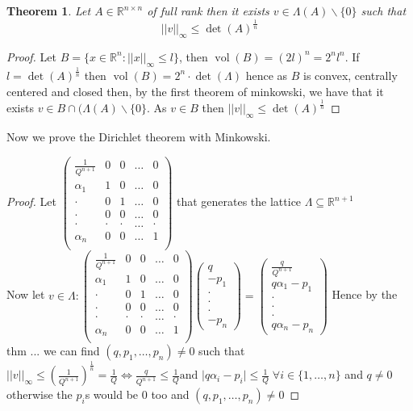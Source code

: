 \documentclass[a4paper,11pt,american]{article}
\newcommand{\R}{\mathbb{R}}
\DeclareMathOperator{\vol}{vol}
\theoremstyle{plain}
\newtheorem{theorem}{Theorem}
\theoremstyle{definition}
\begin{document}
\begin{theorem}
    Let $A\in \R^{n\times n}$ of full rank then it exists $v\in \Lambda(A)\backslash\{0\}$ such that $$\vert\vert v\vert\vert _{\infty}\leq \det(A)^\frac{1}{n}$$
\end{theorem}
\begin{proof}
    Let $B=\{x\in \R^n:\vert\vert x\vert\vert_{\infty}\leq l\}$, then $\vol(B)=(2l)^n=2^nl^n$. If $l= \det(A)^\frac{1}{n}$ then $\vol(B)=2^n\cdot\det(\Lambda)$ hence as $B$ is convex, centrally centered and closed then, by the first theorem of minkowski, we have that it exists $v\in B\cap (\Lambda(A)\backslash \{0\}$. As $v\in B$ then $\vert\vert v\vert\vert _{\infty}\leq \det(A)^\frac{1}{n}$ 
\end{proof}
Now we prove the Dirichlet theorem with Minkowski.
\begin{proof}
    
Let $\begin{pmatrix}
    \frac{1}{Q^{n+1}}& 0& 0 &\dots& 0\\
    \alpha_1& 1&0&\dots&0\\
    \cdot&0&1&\dots&0\\
    \cdot&0&0&\dots&0\\
    \cdot&\cdot&\cdot&\dots&\cdot\\
    \alpha_n&0&0&\dots&1\\
\end{pmatrix}$
 that generates the lattice $\Lambda\subseteq\R^{n+1}$\\
 Now let $v\in\Lambda:\begin{pmatrix}
    \frac{1}{Q^{n+1}}& 0& 0 &\dots& 0\\
    \alpha_1& 1&0&\dots&0\\
    \cdot&0&1&\dots&0\\
    \cdot&0&0&\dots&0\\
    \cdot&\cdot&\cdot&\dots&\cdot\\
    \alpha_n&0&0&\dots&1\\
\end{pmatrix}\begin{pmatrix}
    q\\
    -p_1\\
    \cdot\\
    \cdot\\
    \cdot\\
    -p_n
\end{pmatrix}=\begin{pmatrix}
    \frac{q}{Q^{n+1}}\\
    q\alpha_1-p_1\\
    \cdot\\
    \cdot\\
    \cdot\\
    q\alpha_n-p_n
\end{pmatrix}$
Hence by the thm ... we can find $(q,p_1,\dots,p_n)\neq 0$ such that $\vert\vert v\vert\vert_{\infty}\leq(\frac{1}{Q^{n+1}})^{\frac{1}{n}}=\frac{1}{Q}\iff \frac{q}{Q^{n+1}}\leq \frac{1}{Q} \text{and } \vert q\alpha_i-p_i\vert\leq \frac{1}{Q} \;\forall i\in\{1,\dots,n\}$ and $q\neq 0$ otherwise the $p_i$s would be $0$ too and $(q,p_1,\dots,p_n)\neq 0$
\end{proof}
\end{document}
